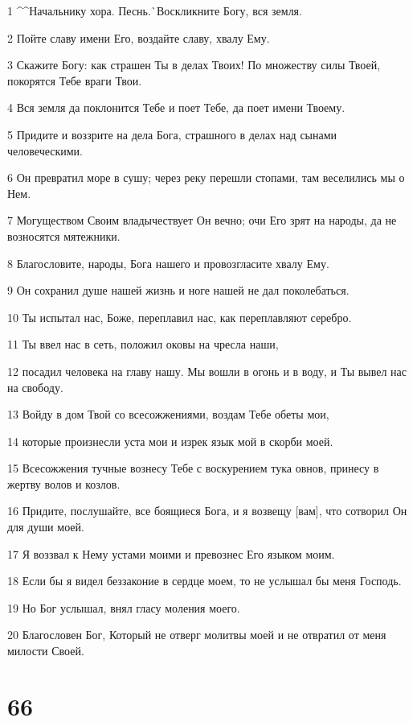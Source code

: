 \par 1 ^^Начальнику хора. Песнь.^^ Воскликните Богу, вся земля.
\par 2 Пойте славу имени Его, воздайте славу, хвалу Ему.
\par 3 Скажите Богу: как страшен Ты в делах Твоих! По множеству силы Твоей, покорятся Тебе враги Твои.
\par 4 Вся земля да поклонится Тебе и поет Тебе, да поет имени Твоему.
\par 5 Придите и воззрите на дела Бога, страшного в делах над сынами человеческими.
\par 6 Он превратил море в сушу; через реку перешли стопами, там веселились мы о Нем.
\par 7 Могуществом Своим владычествует Он вечно; очи Его зрят на народы, да не возносятся мятежники.
\par 8 Благословите, народы, Бога нашего и провозгласите хвалу Ему.
\par 9 Он сохранил душе нашей жизнь и ноге нашей не дал поколебаться.
\par 10 Ты испытал нас, Боже, переплавил нас, как переплавляют серебро.
\par 11 Ты ввел нас в сеть, положил оковы на чресла наши,
\par 12 посадил человека на главу нашу. Мы вошли в огонь и в воду, и Ты вывел нас на свободу.
\par 13 Войду в дом Твой со всесожжениями, воздам Тебе обеты мои,
\par 14 которые произнесли уста мои и изрек язык мой в скорби моей.
\par 15 Всесожжения тучные вознесу Тебе с воскурением тука овнов, принесу в жертву волов и козлов.
\par 16 Придите, послушайте, все боящиеся Бога, и я возвещу [вам], что сотворил Он для души моей.
\par 17 Я воззвал к Нему устами моими и превознес Его языком моим.
\par 18 Если бы я видел беззаконие в сердце моем, то не услышал бы меня Господь.
\par 19 Но Бог услышал, внял гласу моления моего.
\par 20 Благословен Бог, Который не отверг молитвы моей и не отвратил от меня милости Своей.

\chapter{66}

